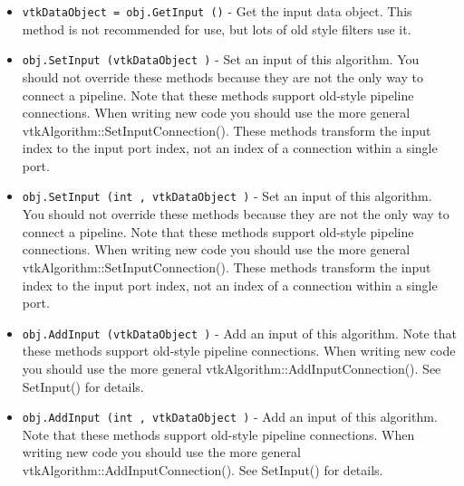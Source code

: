 \begin{itemize}
\item  \verb|vtkDataObject = obj.GetInput ()| -  Get the input data object. This method is not recommended for use, but
 lots of old style filters use it.

\item  \verb|obj.SetInput (vtkDataObject )| -  Set an input of this algorithm. You should not override these
 methods because they are not the only way to connect a pipeline.
 Note that these methods support old-style pipeline connections.
 When writing new code you should use the more general
 vtkAlgorithm::SetInputConnection().  These methods transform the
 input index to the input port index, not an index of a connection
 within a single port.

\item  \verb|obj.SetInput (int , vtkDataObject )| -  Set an input of this algorithm. You should not override these
 methods because they are not the only way to connect a pipeline.
 Note that these methods support old-style pipeline connections.
 When writing new code you should use the more general
 vtkAlgorithm::SetInputConnection().  These methods transform the
 input index to the input port index, not an index of a connection
 within a single port.

\item  \verb|obj.AddInput (vtkDataObject )| -  Add an input of this algorithm.  Note that these methods support
 old-style pipeline connections.  When writing new code you should
 use the more general vtkAlgorithm::AddInputConnection().  See
 SetInput() for details.

\item  \verb|obj.AddInput (int , vtkDataObject )| -  Add an input of this algorithm.  Note that these methods support
 old-style pipeline connections.  When writing new code you should
 use the more general vtkAlgorithm::AddInputConnection().  See
 SetInput() for details.

\end{itemize}

